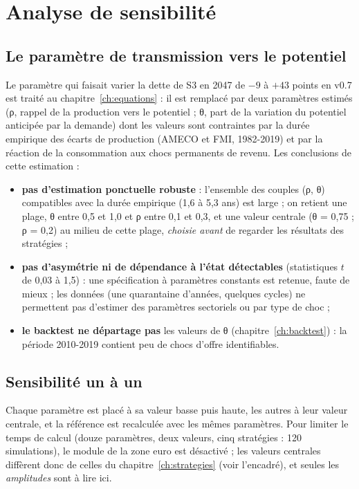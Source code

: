 \chapter{Analyse de sensibilité}\label{ch:sensibilite}

\section{Le paramètre de transmission vers le potentiel}

Le paramètre qui faisait varier la dette de S3 en 2047 de $-9$ à $+43$ points en v0.7 est traité au
chapitre~\ref{ch:equations} : il est remplacé par deux paramètres estimés (ρ, rappel de la production vers le
potentiel ; θ, part de la variation du potentiel anticipée par la demande) dont les valeurs sont contraintes par la
durée empirique des écarts de production (AMECO et FMI, 1982-2019) et par la réaction de la consommation aux chocs
permanents de revenu. Les conclusions de cette estimation :
\begin{itemize}
\item \textbf{pas d'estimation ponctuelle robuste} : l'ensemble des couples (ρ, θ) compatibles avec la durée empirique
(1,6 à 5,3 ans) est large ; on retient une plage, θ entre 0,5 et 1,0 et ρ entre 0,1 et 0,3, et une valeur centrale
(θ = 0,75 ; ρ = 0,2) au milieu de cette plage, \emph{choisie avant} de regarder les résultats des stratégies ;
\item \textbf{pas d'asymétrie ni de dépendance à l'état détectables} (statistiques $t$ de 0,03 à 1,5) : une
spécification à paramètres constants est retenue, faute de mieux ; les données (une quarantaine d'années, quelques
cycles) ne permettent pas d'estimer des paramètres sectoriels ou par type de choc ;
\item \textbf{le backtest ne départage pas} les valeurs de θ (chapitre~\ref{ch:backtest}) : la période 2010-2019 contient
peu de chocs d'offre identifiables.
\end{itemize}

\section{Sensibilité un à un}

Chaque paramètre est placé à sa valeur basse puis haute, les autres à leur valeur centrale, et la référence est
recalculée avec les mêmes paramètres. Pour limiter le temps de calcul (douze paramètres, deux valeurs, cinq
stratégies : 120 simulations), le module de la zone euro est désactivé ; les valeurs centrales diffèrent donc de celles
du chapitre~\ref{ch:strategies} (voir l'encadré), et seules les \emph{amplitudes} sont à lire ici.

